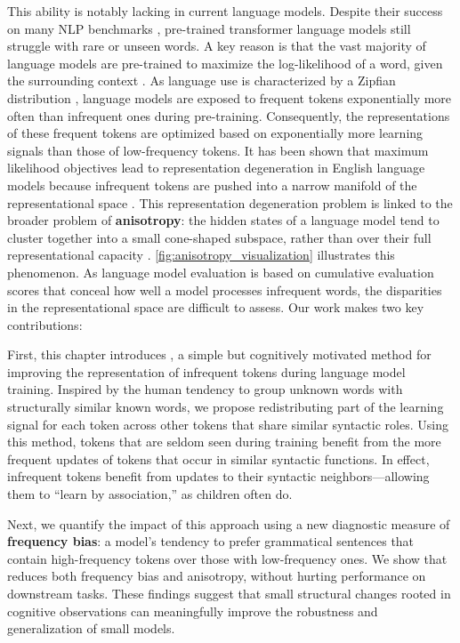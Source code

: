 This ability is notably lacking in current language models. Despite their success on many NLP benchmarks \citep{touvron2023llama, chowdhery2023palm}, pre-trained transformer language models still struggle with rare or unseen words. A key reason is that the vast majority of language models are pre-trained to maximize the log-likelihood of a word, given the surrounding context \citep{devlin2019bert, brown2020gpt3, chowdhery2023palm, touvron2023llama}. As language use is characterized by a Zipfian distribution \citep{zipf1935zipflaw}, language models are exposed to frequent tokens exponentially more often than infrequent ones during pre-training. Consequently, the representations of these frequent tokens are optimized based on exponentially more learning signals than those of low-frequency tokens. It has been shown that maximum likelihood objectives lead to representation degeneration in English language models because infrequent tokens are pushed into a narrow manifold of the representational space \citep{gao2018representation}. This representation degeneration problem is linked to the broader problem of \textbf{anisotropy}: the hidden states of a language model tend to cluster together into a small cone-shaped subspace, rather than over their full representational capacity \citep{arora2016latent, ethayarajh2019contextual, gao2018representation}. \cref{fig:anisotropy_visualization} illustrates this phenomenon. As language model evaluation is based on cumulative evaluation scores that conceal how well a model processes infrequent words, the disparities in the representational space are difficult to assess. Our work makes two key contributions:

First, this chapter introduces \smoothing, a simple but cognitively motivated method for improving the representation of infrequent tokens during language model training. Inspired by the human tendency to group unknown words with structurally similar known words, we propose redistributing part of the learning signal for each token across other tokens that share similar syntactic roles. Using this method, tokens that are seldom seen during training benefit from the more frequent updates of tokens that occur in similar syntactic functions.  In effect, infrequent tokens benefit from updates to their syntactic neighbors—allowing them to ``learn by association,'' as children often do.

Next, we quantify the impact of this approach using a new diagnostic measure of \textbf{frequency bias}: a model's tendency to prefer grammatical sentences that contain high-frequency tokens over those with low-frequency ones. We show that \smoothing reduces both frequency bias and anisotropy, without hurting performance on downstream tasks. These findings suggest that small structural changes rooted in cognitive observations can meaningfully improve the robustness and generalization of small models.

